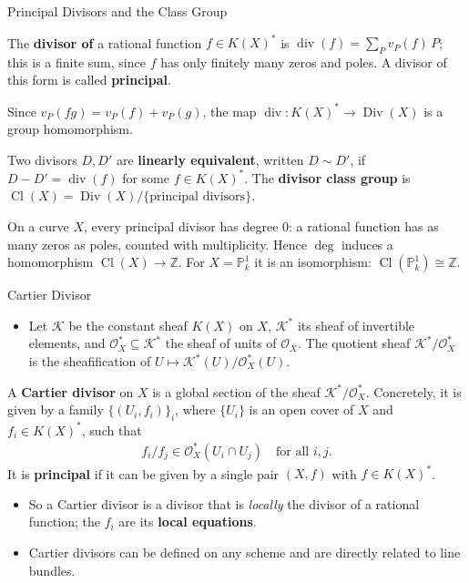 \documentclass[10pt,aspectratio=1610]{beamer}
\DeclareMathOperator{\Div}{Div}
\DeclareMathOperator{\Cl}{Cl}
\DeclareMathOperator{\divv}{div}
\newcommand{\OO}{\mathcal{O}}
\newcommand{\KK}{\mathcal{K}}
\newcommand{\PP}{\mathbb{P}}
\newcommand{\Z}{\mathbb{Z}}
\begin{document}
    \begin{frame}{Principal Divisors and the Class Group}
        \begin{definition}
            The \textbf{divisor of} a rational function $f \in K(X)^*$ is $\divv(f) = \sum_{P} v_P(f)\, P$; this is a finite sum, since $f$ has only finitely many zeros and poles. A divisor of this form is called \textbf{principal}.
        \end{definition}
        Since $v_P(fg) = v_P(f) + v_P(g)$, the map $\divv \colon K(X)^* \to \Div(X)$ is a group homomorphism.
        \begin{definition}
            Two divisors $D, D'$ are \textbf{linearly equivalent}, written $D \sim D'$, if $D - D' = \divv(f)$ for some $f \in K(X)^*$. The \textbf{divisor class group} is $\Cl(X) = \Div(X) / \{\text{principal divisors}\}$.
        \end{definition}
        \begin{theorem}
            On a curve $X$, every principal divisor has degree $0$: a rational function has as many zeros as poles, counted with multiplicity. Hence $\deg$ induces a homomorphism $\Cl(X) \to \Z$. For $X = \PP^1_k$ it is an isomorphism: $\Cl(\PP^1_k) \cong \Z$.
        \end{theorem}
    \end{frame}

    \begin{frame}{Cartier Divisor}
        \begin{itemize}
            \item Let $\KK$ be the constant sheaf $K(X)$ on $X$, $\KK^*$ its sheaf of invertible elements, and $\OO_X^* \subseteq \KK^*$ the sheaf of units of $\OO_X$. The quotient sheaf $\KK^* / \OO_X^*$ is the sheafification of $U \mapsto \KK^*(U) / \OO_X^*(U)$.
        \end{itemize}
        \begin{definition}
            A \textbf{Cartier divisor} on $X$ is a global section of the sheaf $\KK^* / \OO_X^*$. Concretely, it is given by a family $\{(U_i, f_i)\}_i$, where $\{U_i\}$ is an open cover of $X$ and $f_i \in K(X)^*$, such that
            \begin{align*}
                f_i / f_j \in \OO_X^*(U_i \cap U_j) \quad \text{for all } i, j.
            \end{align*}
            It is \textbf{principal} if it can be given by a single pair $(X, f)$ with $f \in K(X)^*$.
        \end{definition}
        \begin{itemize}
            \item So a Cartier divisor is a divisor that is \emph{locally} the divisor of a rational function; the $f_i$ are its \textbf{local equations}.
            \item Cartier divisors can be defined on any scheme and are directly related to line bundles.
        \end{itemize}
    \end{frame}
\end{document}
